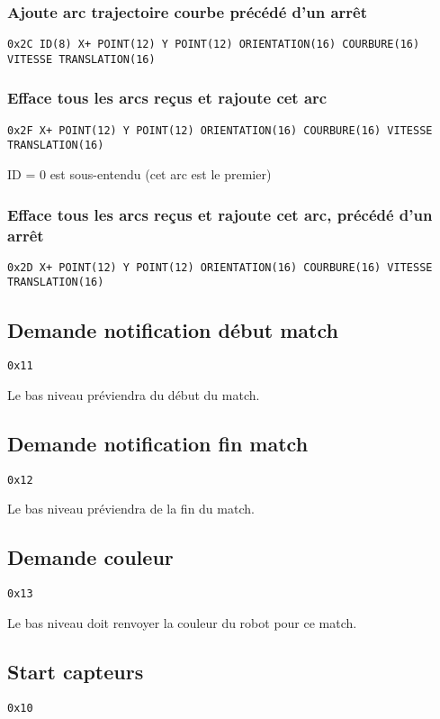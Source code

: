 \documentclass[a4paper, 12pt]{article}
\begin{document}
\subsubsection{Ajoute arc trajectoire courbe précédé d'un arrêt}

\texttt{0x2C ID(8) X+ POINT(12) Y POINT(12) ORIENTATION(16) COURBURE(16) VITESSE TRANSLATION(16)}

\subsubsection{Efface tous les arcs reçus et rajoute cet arc}

\texttt{0x2F X+ POINT(12) Y POINT(12) ORIENTATION(16) COURBURE(16) VITESSE TRANSLATION(16)}
    
ID = 0 est sous-entendu (cet arc est le premier)
    
\subsubsection{Efface tous les arcs reçus et rajoute cet arc, précédé d'un arrêt} 

\texttt{0x2D X+ POINT(12) Y POINT(12) ORIENTATION(16) COURBURE(16) VITESSE TRANSLATION(16)}
   
\subsection{Demande notification début match}
    \texttt{0x11}

Le bas niveau préviendra du début du match.
   
   \subsection{Demande notification fin match}
       \texttt{0x12}
   
   Le bas niveau préviendra de la fin du match.
   
\subsection{Demande couleur}
    \texttt{0x13}

Le bas niveau doit renvoyer la couleur du robot pour ce match.

    
\subsection{Start capteurs}
\texttt{0x10}
    
\end{document}
